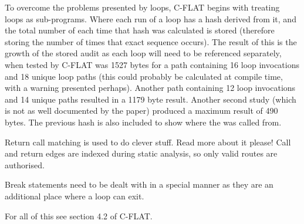 To overcome the problems presented by loops, C-FLAT \cite{Abera2016} begins with treating loops as sub-programs. Where each run of a loop has a hash derived from it, and the total number of each time that hash was calculated is stored (therefore storing the number of times that exact sequence occurs). The result of this is the growth of the stored audit as each loop will need to be referenced separately, when tested by C-FLAT was 1527 bytes for a path containing 16 loop invocations and 18 unique loop paths (this could probably be calculated at compile time, with a warning presented perhaps). Another path containing 12 loop invocations and 14 unique paths resulted in a 1179 byte result. Another second study (which is not as well documented by the paper) produced a maximum result of 490 bytes. The previous hash is also included to show where the was called from. 

Return call matching is used to do clever stuff. Read more about it please! Call and return edges are indexed during static analysis, so only valid routes are authorised.

Break statements need to be dealt with in a special manner as they are an additional place where a loop can exit. 

For all of this see section 4.2 of C-FLAT.